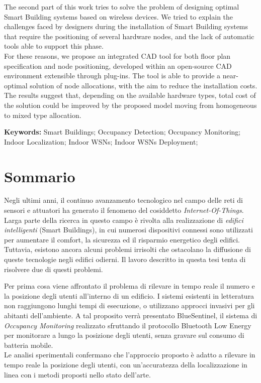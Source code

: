 The second part of this work tries to solve the problem of designing optimal Smart Building systems based on wireless devices. We tried to explain the challenges faced by designers during the installation of Smart Building systems that require the positioning of several hardware nodes, and the lack of automatic tools able to support this phase.\\
For these reasons, we propose an integrated CAD tool for both floor plan specification and node positioning, developed within an \mbox{open-source} CAD environment extensible through plug-ins. The tool is able to provide a near-optimal solution of node allocations, with the aim to reduce the installation costs. The results suggest that, depending on the available hardware types, total cost of the solution could be improved by the proposed model moving from homogeneous to mixed type allocation.

\medskip
%
\noindent \textbf{Keywords:} 
Smart Buildings; Occupancy Detection; Occupancy Monitoring; Indoor Localization; Indoor WSNs; Indoor WSNs Deployment;
%
\clearpage
%
%
%
%
%
\chapter*{Sommario}
%
Negli ultimi anni, il continuo avanzamento tecnologico nel campo delle reti di sensori e attuatori ha generato il fenomeno del cosiddetto \emph{Internet-Of-Things}. Larga parte della ricerca in questo campo è rivolta alla realizzazione di \emph{edifici intelligenti} (Smart Buildings), in cui numerosi dispositivi connessi sono utilizzati per aumentare il comfort, la sicurezza ed il risparmio energetico degli edifici. Tuttavia, esistono ancora alcuni problemi irrisolti che ostacolano la diffusione di queste tecnologie negli edifici odierni. Il lavoro descritto in questa tesi tenta di risolvere due di questi problemi.

Per prima cosa viene affrontato il problema di rilevare in tempo reale il numero e la posizione degli utenti all'interno di un edificio. I sistemi esistenti in letteratura non raggiungono lunghi tempi di esecuzione, o utilizzano approcci invasivi per gli abitanti dell'ambiente.
A tal proposito verrà presentato BlueSentinel, il sistema di \emph{Occupancy Monitoring} realizzato sfruttando il protocollo Bluetooth Low Energy per monitorare a lungo la posizione degli utenti, senza gravare sul consumo di batteria mobile.\\
Le analisi sperimentali confermano che l'approccio proposto è adatto a rilevare in tempo reale la posizione degli utenti, con un'accuratezza della localizzazione in linea con i metodi proposti nello stato dell'arte.

